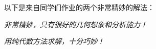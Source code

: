 以下是来自同学们作业的两个非常精妙的解法：
\begin{center}
	
	{\it 非常精妙，具有很好的几何想象和分析能力！}
	
	\bigskip\bigskip

	
	{\it 用纯代数方法求解，十分巧妙！}
\end{center}

